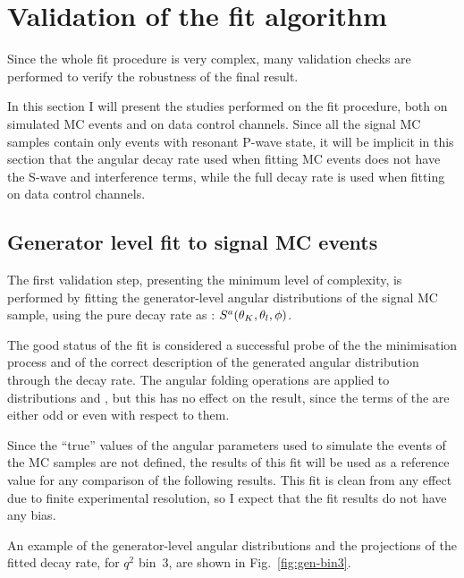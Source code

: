 \chapter{Validation of the fit algorithm}
\label{sec:validation}

Since the whole fit procedure is very complex, many validation checks are performed to verify the robustness of the final result.

In this section I will present the studies performed on the fit procedure, both on simulated MC events and on data control channels.
Since all the signal MC samples contain only events with resonant P-wave \PKpi state, it will be implicit in this section that the angular decay rate used when fitting MC events does not have the S-wave and interference terms, while the full decay rate is used when fitting on data control channels.

\section{Generator level fit to signal MC events}
\label{sec:fitval-gen}

The first validation step, presenting the minimum level of complexity, is performed by fitting the generator-level angular distributions of the signal MC sample, using the pure decay rate as \pdf: $S^a(\theta_K,\theta_l,\phi)$.

The good status of the fit is considered a successful probe of the the minimisation process and of the correct description of the generated angular distribution through the decay rate.
The angular folding operations are applied to distributions and \pdfs, but this has no effect on the result, since the terms of the \pdf are either odd or even with respect to them.

Since the ``true'' values of the angular parameters used to simulate the events of the MC samples are not defined, the results of this fit will be used as a reference value for any comparison of the following results.
This fit is clean from any effect due to finite experimental resolution, so I expect that the fit results do not have any bias.

An example of the generator-level angular distributions and the projections of the fitted decay rate, for $q^2$ bin~3, are shown in Fig.~\ref{fig:gen-bin3}.


